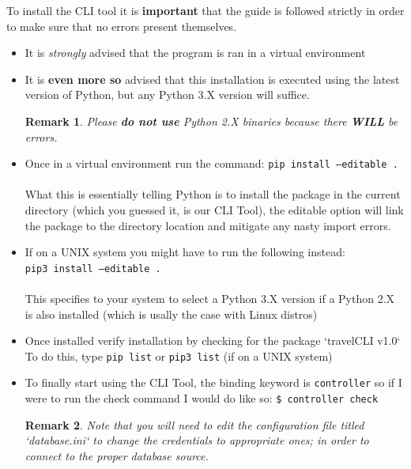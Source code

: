 \documentclass[12pt, lettersize]{article}
\theoremstyle{Remark}
\newtheorem*{remark}{Remark}
\begin{document}
		 
	 To install the CLI tool it is \textbf{important} that the guide is followed strictly in order to make sure that no errors present themselves.
	 
	 \begin{itemize}
	 	
	 	\item It is \textsl{strongly} advised that the program is ran in a virtual environment
	 	
	 	\item It is \textbf{even more so} advised that this installation is executed using the latest version of Python, but any Python 3.X version will suffice.
	 	
	 	\begin{remark}
	 		Please \textbf{do not use} Python 2.X binaries because there \textbf{WILL} be errors.
	 	\end{remark}
	 	
	 	\item  Once in a virtual environment run the command: \texttt{pip install --editable .} \\\\
	 	What this is essentially telling Python is to install the package in the current directory (which you guessed it, is our CLI Tool), the editable option will link the package to the directory location and mitigate any nasty import errors.
	 	
	 	\item If on a UNIX system you might have to run the following instead: \\
	 	\texttt{pip3 install --editable .} \\ \\
	 	This specifies to your system to select a Python 3.X version if a Python 2.X is also installed (which is usally the case with Linux distros)
	 	
	 	\item Once installed verify installation by checking for the package `travelCLI   v1.0`
	 	To do this, type \texttt{pip list} or \texttt{pip3 list} (if on a UNIX system)
	 	
	 	\item To finally start using the CLI Tool, the binding keyword is \texttt{controller} so if I were to run the check command I would do like so:
	 	\texttt{\$ controller check}
	 	
	 	\begin{remark}
	 		Note that you will need to edit the configuration file titled `database.ini` to change the credentials to appropriate ones; in order to connect to the proper database source.
	 	\end{remark}
	 	
	 \end{itemize}
	 
\end{document}
